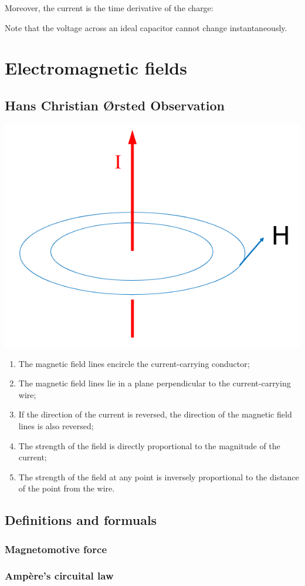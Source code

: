 \documentclass{article}
\begin{document}
Moreover, the current is the time derivative of the charge:

Note that the voltage across an ideal capacitor cannot change instantaneously.

\newpage
\section{Electromagnetic fields}
\subsection{Hans Christian Ørsted Observation}
\begin{center}
    \includegraphics[width=.4\textwidth]{media/observations.png}
\end{center}
\begin{enumerate}
    \item The magnetic field lines encircle the current-carrying conductor;
    \item The magnetic field lines lie in a plane perpendicular to the current-carrying wire;
    \item If the direction of the current is reversed, the direction of the magnetic field lines is also reversed;
    \item The strength of the field is directly proportional to the magnitude of the current;
    \item The strength of the field at any point is inversely proportional to the distance of the point from the wire.
\end{enumerate}

\subsection{Definitions and formuals}
\subsubsection{Magnetomotive force}

\subsubsection{Ampère's circuital law}
\end{document}
